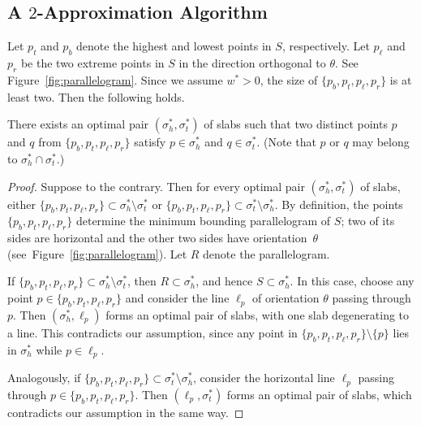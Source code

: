 \subsection{A \texorpdfstring{$2$}{2}-Approximation Algorithm}
\label{sec:2_apx_two_fixed}

Let $p_t$ and $p_b$ denote the highest and lowest points in $S$, respectively.
Let $p_\ell$ and $p_r$ be the two extreme points in $S$ in the direction orthogonal to $\theta$. See Figure~\ref{fig:parallelogram}. 
Since we assume $w^* > 0$, the size of $\{p_b, p_t, p_\ell, p_r\}$ is at least two.
Then the following holds.


\begin{lemma}
    \label{lem:two_fixed_extreme_pts}
    There exists an optimal pair $(\sigma_h^*, \sigma_t^*)$ of slabs such that two distinct points $p$ and $q$ from $\{p_b, p_t, p_\ell, p_r\}$ satisfy $p \in \sigma_h^*$ and $q \in \sigma_t^*$.
    (Note that $p$ or $q$ may belong to $\sigma_h^* \cap \sigma_t^*$.)
\end{lemma}
\begin{proof}
    Suppose to the contrary. 
    Then for every optimal pair $(\sigma_h^*, \sigma_t^*)$ of slabs, either $\{p_b, p_t, p_\ell, p_r\} \subset \sigma_h^* \setminus \sigma_t^*$ or $\{p_b, p_t, p_\ell, p_r\} \subset \sigma_t^* \setminus \sigma_h^*$.
    By definition, the points $\{p_b, p_t, p_\ell, p_r\}$ determine the minimum bounding parallelogram of $S$; two of its sides are horizontal and the other two sides have orientation~$\theta$ (see~Figure~\ref{fig:parallelogram}). 
    Let $R$ denote the parallelogram. 
    
    If $\{p_b, p_t, p_\ell, p_r\} \subset \sigma_h^* \setminus \sigma_t^*$, then $R \subset \sigma_h^*$, and hence $S \subset \sigma_h^*$.
    In this case, choose any point $p \in \{p_b, p_t, p_\ell, p_r\}$ and consider the line $\ell_p$ of orientation $\theta$ passing through $p$. 
    Then $(\sigma_h^*, \ell_p)$ forms an optimal pair of slabs, with one slab degenerating to a line.
    This contradicts our assumption, since any point in $\{p_b, p_t, p_\ell, p_r\}\setminus\{p\}$ lies in $\sigma_h^*$ while $p \in \ell_p$.
    
    Analogously, if $\{p_b, p_t, p_\ell, p_r\} \subset \sigma_t^* \setminus \sigma_h^*$, consider the horizontal line $\ell_p$ passing through $p \in \{p_b, p_t, p_\ell, p_r\}$.
    Then $(\ell_p, \sigma_t^*)$ forms an optimal pair of slabs, which contradicts our assumption in the same way.
\end{proof}



